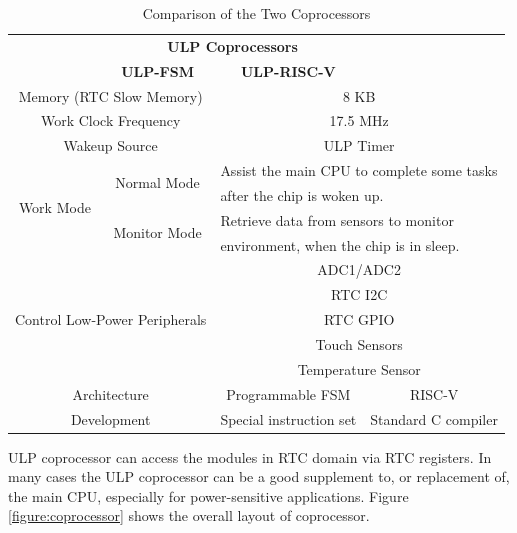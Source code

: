 \documentclass[main\_\_EN.tex]{subfiles}
\begin{document}
\begin{table}[!ht]
    \caption{Comparison of the Two Coprocessors}
    \centering
     \begin{tabular}[c]{| c | c | c | c |}
    \hline
    \rowcolor{lightgray}
    \multicolumn{2}{|c}{} & \multicolumn{2}{|c|}{\textbf{ULP Coprocessors}}         \\
    \cline{3-4}
    \rowcolor{lightgray}
    \multicolumn{2}{|c|}{\multirow{-2}{*}{\textbf{Feature}}} & \textbf{ULP-FSM} & \textbf{ULP-RISC-V}  \\
    \hline
    \multicolumn{2}{|c}{Memory (RTC Slow Memory) }  & \multicolumn{2}{|c|}{8 KB}  \\
    \hline
    \multicolumn{2}{|c}{Work Clock Frequency} & \multicolumn{2}{|c|}{17.5 MHz} \\
    \hline
    \multicolumn{2}{|c}{Wakeup Source} & \multicolumn{2}{|c|}{ULP Timer} \\
    \hline
    \multirow{4}{*}{Work Mode} & \multirow{2}{*}{Normal Mode} & \multicolumn{2}{l|}{Assist the main CPU to complete some tasks } \\
    & &  \multicolumn{2}{l|}{after the chip is woken up.} \\
    \cline{2-4}
    & \multirow{2}{*}{Monitor Mode} & \multicolumn{2}{l|}{Retrieve data from sensors to monitor} \\
    & & \multicolumn{2}{l|}{ environment, when the chip is in sleep.} \\
    \hline
    \multicolumn{2}{|c}{\multirow{5}{*}{Control Low-Power Peripherals}} & \multicolumn{2}{|c|}{ ADC1/ADC2 }    \\
    \cline{3-4}
    \multicolumn{2}{|c}{} & \multicolumn{2}{|c|}{RTC I2C}  \\
    \cline{3-4}
    \multicolumn{2}{|c}{} & \multicolumn{2}{|c|}{RTC GPIO}  \\
     \cline{3-4}
    \multicolumn{2}{|c}{} & \multicolumn{2}{|c|}{Touch Sensors}  \\
     \cline{3-4}
    \multicolumn{2}{|c}{} & \multicolumn{2}{|c|}{Temperature Sensor}   \\
    \hline
    \multicolumn{2}{|c|}{Architecture} & Programmable FSM & RISC-V\\
    \hline
    \multicolumn{2}{|c|}{Development} & Special instruction set & Standard C compiler \\
    \hline
    \end{tabular}
\end{table}

ULP coprocessor can access the modules in RTC domain via RTC registers. In many cases the ULP coprocessor can be a good supplement to, or replacement of, the main CPU, especially for power-sensitive applications. Figure \ref{figure:coprocessor} shows the overall layout of \chipname{} coprocessor. 
\end{document}
